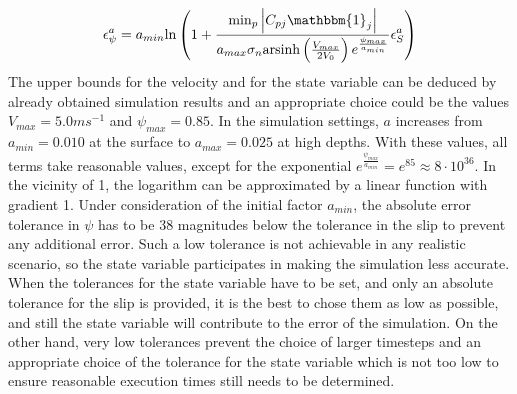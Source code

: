 \documentclass{report}
\begin{document}
\begin{equation}
    \epsilon_\psi^a = a_{min}\text{ln}\left( 1+\frac{\min_p\left|C_{pj}\mathbbm{1}_j\right|}{a_{max}\sigma_n \text{arsinh}\left(\frac{V_{max}}{2V_0}\right) e^{\frac{\psi_{max}}{a_{min}}}}\epsilon_S^a\right)
\end{equation}
The upper bounds for the velocity and for the state variable can be deduced by already obtained simulation results and an appropriate choice could be the values $V_{max} = 5.0ms^{-1}$ and $\psi_{max} = 0.85$. In the simulation settings, $a$ increases from $a_{min}=0.010$ at the surface to $a_{max}=0.025$ at high depths. With these values, all terms take reasonable values, except for the exponential $e^{\frac{\psi_{max}}{a_{min}}} = e^{85} \approx 8\cdot10^{36}$. In the vicinity of 1,  the logarithm can be approximated by a linear function with gradient 1. Under consideration of the initial factor $a_{min}$, the absolute error tolerance in $\psi$ has to be 38 magnitudes below the tolerance in the slip to prevent any additional error. Such a low tolerance is not achievable in any realistic scenario, so the state variable participates in making the simulation less accurate. When the tolerances for the state variable have to be set, and only an absolute tolerance for the slip is provided, it is the best to chose them as low as possible, and still the state variable will contribute to the error of the simulation. On the other hand, very low tolerances prevent the choice of larger timesteps and an appropriate choice of the tolerance for the state variable which is not too low to ensure reasonable execution times still needs to be determined.  
\end{document}
